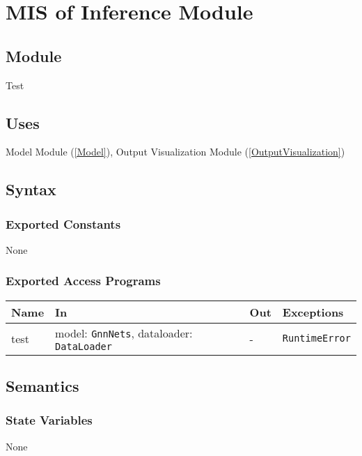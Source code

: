 \documentclass[12pt, titlepage]{article}
\begin{document}
\newpage








\section{MIS of Inference Module} \label{Test}

\subsection{Module}
Test

\subsection{Uses}
Model Module (\ref{Model}), Output Visualization Module (\ref{OutputVisualization})

\subsection{Syntax}

\subsubsection{Exported Constants}
None

\subsubsection{Exported Access Programs}

\begin{center}
\begin{tabular}{p{2cm} p{6cm} p{4cm} p{3.5cm}}
\hline
\textbf{Name} & \textbf{In} & \textbf{Out} & \textbf{Exceptions} \\
\hline
test & model: \texttt{GnnNets}, dataloader: \texttt{DataLoader} & - & \texttt{RuntimeError} \\
\hline
\end{tabular}
\end{center}

\subsection{Semantics}

\subsubsection{State Variables}
None
\end{document}
